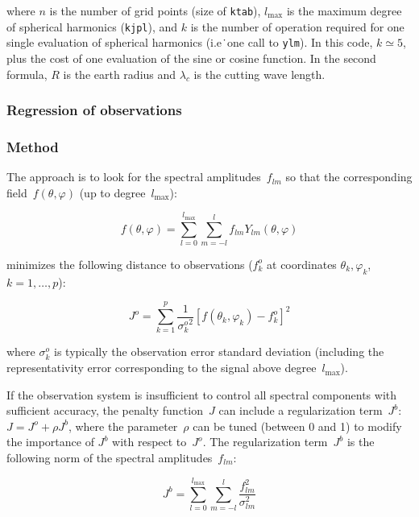 \documentclass[11pt]{article}
\begin{document}
\noindent
where $n$ is the number of grid points (size of {\tt ktab}),
$l_{\max}$ is the maximum degree of spherical harmonics ({\tt kjpl}), and
$k$ is the number of operation required for one single evaluation
of spherical harmonics (i.e\. one call to {\tt ylm}).
In this code, $k\simeq 5$, plus the cost of one evaluation of the sine or cosine function.
In the second formula, $R$ is the earth radius
and $\lambda_c$ is the cutting wave length.

\subsubsection{Regression of observations}
\label{sec:regr}

\subsubsection*{Method}

The approach is to look for the spectral amplitudes~$f_{lm}$
so that the corresponding field~$f(\theta,\varphi)$
(up to degree~$l_{\max}$):

\begin{equation}
\label{eq:spect-inv-lmax}
f(\theta,\varphi) = \sum_{l=0}^{l_{\max}} \sum_{m=-l}^l
                    f_{lm} Y_{lm}(\theta,\varphi)
\end{equation}

\noindent
minimizes the following distance to observations
($f^o_k$ at coordinates $\theta_k,\varphi_k$, $k=1,\ldots,p$):

\begin{equation}
\label{eq:Jo}
J^o = \sum_{k=1}^p \frac{1}{{\sigma^o_k}^2}
         \left[ f(\theta_k,\varphi_k) - f^o_k \right]^2
\end{equation}

\noindent
where $\sigma^o_k$ is typically the observation error standard deviation
(including the representativity error corresponding
to the signal above degree~$l_{\max}$).

If the observation system is insufficient to control all spectral components
with sufficient accuracy, the penalty function~$J$ can include
a regularization term~$J^b$: $J=J^o + \rho J^b$,
where the parameter~$\rho$ can be tuned (between 0 and 1)
to modify the importance of $J^b$ with respect to~$J^o$.
The regularization term~$J^b$ is the following norm
of the spectral amplitudes~$f_{lm}$:

\begin{equation}
\label{eq:Jb}
J^b = \sum_{l=0}^{l_{\max}} \sum_{m=-l}^l
      \frac{f_{lm}^2}{\sigma_{lm}^2}
\end{equation}
\end{document}
